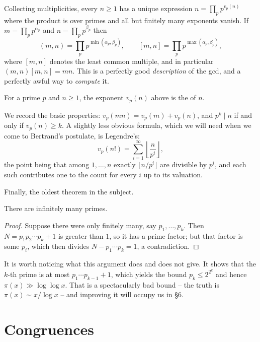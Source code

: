 \begin{remark}
	Collecting multiplicities, every $n \geq 1$ has a unique expression $n = \prod_p p^{v_p(n)}$ where the product is over primes and all but finitely many exponents vanish. If $m = \prod_p p^{\alpha_p}$ and $n = \prod_p p^{\beta_p}$ then
	$$
	(m, n) = \prod_p p^{\min(\alpha_p, \beta_p)}, \qquad [m, n] = \prod_p p^{\max(\alpha_p, \beta_p)},
	$$
	where $[m,n]$ denotes the least common multiple, and in particular $(m,n)[m,n] = mn$. This is a perfectly good \emph{description} of the gcd, and a perfectly awful way to \emph{compute} it.
\end{remark}

\begin{definition}
	For a prime $p$ and $n \geq 1$, the exponent $v_p(n)$ above is the  of $n$.
\end{definition}

We record the basic properties: $v_p(mn) = v_p(m) + v_p(n)$, and $p^k \mid n$ if and only if $v_p(n) \geq k$. A slightly less obvious formula, which we will need when we come to Bertrand's postulate, is Legendre's:
$$
v_p(n!) = \sum_{i = 1}^\infty \left\lfloor \frac{n}{p^i} \right\rfloor,
$$
the point being that among $1, \dots, n$ exactly $\lfloor n/p^i \rfloor$ are divisible by $p^i$, and each such contributes one to the count for every $i$ up to its valuation.

Finally, the oldest theorem in the subject.

\begin{theorem}[Euclid]
	There are infinitely many primes.
\end{theorem}
\begin{proof}
	Suppose there were only finitely many, say $p_1, \dots, p_k$. Then $N = p_1 p_2 \cdots p_k + 1$ is greater than $1$, so it has a prime factor; but that factor is some $p_i$, which then divides $N - p_1 \cdots p_k = 1$, a contradiction.
\end{proof}

\begin{remark}
	It is worth noticing what this argument does and does not give. It shows that the $k$-th prime is at most $p_1 \cdots p_{k-1} + 1$, which yields the bound $p_k \leq 2^{2^k}$ and hence $\pi(x) \gg \log \log x$. That is a spectacularly bad bound -- the truth is $\pi(x) \sim x/\log x$ -- and improving it will occupy us in \S6.
\end{remark}

\section{Congruences}

